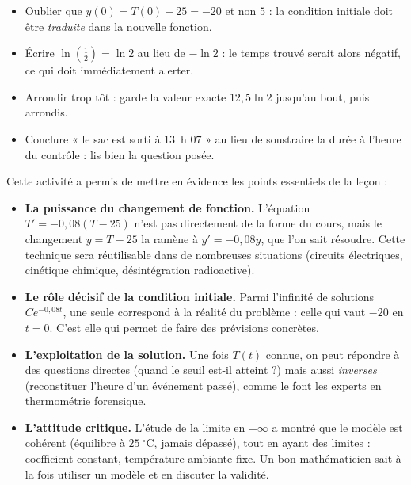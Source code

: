 \documentclass[11pt]{article}
\newcounter{popsec}
\newcounter{popsub}
\newcommand{\courssub}[1]{%
  \stepcounter{popsub}%
  \par\vspace{9pt}\noindent{\popxbold\fontsize{11.5}{13}\selectfont\color{popink}{\color{poporange}\thepopsec.\thepopsub}\hspace{6pt}#1}\par\nopagebreak\vspace{4pt}
}
\begin{document}
\begin{attention}
\begin{itemize}
\item Oublier que $y(0) = T(0) - 25 = -20$ et non $5$ : la condition initiale doit être \emph{traduite} dans la nouvelle fonction.
\item Écrire $\ln\!\left(\tfrac{1}{2}\right) = \ln 2$ au lieu de $-\ln 2$ : le temps trouvé serait alors négatif, ce qui doit immédiatement alerter.
\item Arrondir trop tôt : garde la valeur exacte $12{,}5\ln 2$ jusqu'au bout, puis arrondis.
\item Conclure « le sac est sorti à $13$~h $07$ » au lieu de soustraire la durée à l'heure du contrôle : lis bien la question posée.
\end{itemize}
\end{attention}

\courssub{Bilan de l'activité}

Cette activité a permis de mettre en évidence les points essentiels de la leçon :

\begin{itemize}
\item \textbf{La puissance du changement de fonction.} L'équation $T' = -0{,}08(T - 25)$ n'est pas directement de la forme du cours, mais le changement $y = T - 25$ la ramène à $y' = -0{,}08y$, que l'on sait résoudre. Cette technique sera réutilisable dans de nombreuses situations (circuits électriques, cinétique chimique, désintégration radioactive).
\item \textbf{Le rôle décisif de la condition initiale.} Parmi l'infinité de solutions $Ce^{-0{,}08t}$, une seule correspond à la réalité du problème : celle qui vaut $-20$ en $t = 0$. C'est elle qui permet de faire des prévisions concrètes.
\item \textbf{L'exploitation de la solution.} Une fois $T(t)$ connue, on peut répondre à des questions directes (quand le seuil est-il atteint ?) mais aussi \emph{inverses} (reconstituer l'heure d'un événement passé), comme le font les experts en thermométrie forensique.
\item \textbf{L'attitude critique.} L'étude de la limite en $+\infty$ a montré que le modèle est cohérent (équilibre à $25~^\circ\mathrm{C}$, jamais dépassé), tout en ayant des limites : coefficient constant, température ambiante fixe. Un bon mathématicien sait à la fois utiliser un modèle et en discuter la validité.
\end{itemize}
\end{document}
